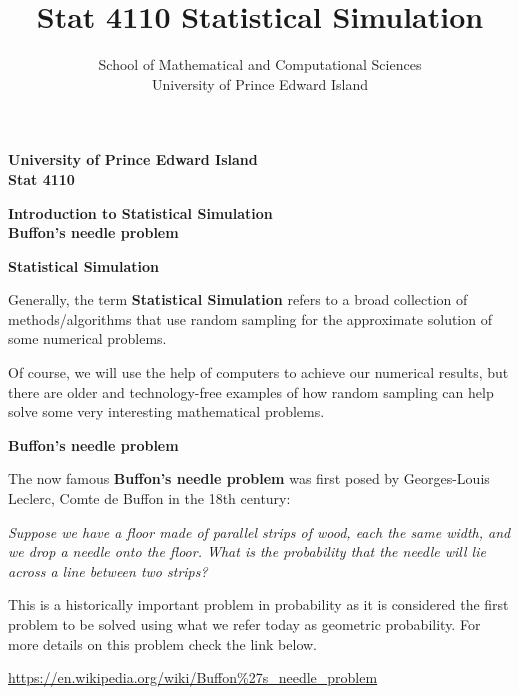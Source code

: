 \documentclass{beamer}
\title[Stat 4110]{Stat 4110 Statistical Simulation}
\author[University of Prince Edward Island]{School of Mathematical and Computational Sciences \\ University of Prince Edward Island}
\begin{document}
\frame
{
\begin{center}
\textbf{University of Prince Edward Island\\ Stat 4110}
\end{center}
\vspace{5mm}
\begin{center}
\textbf{Introduction to Statistical Simulation\\ Buffon's needle problem}\\
\end{center}
\vspace{5mm}

}

\frame
{

{\bf Statistical Simulation}
\vspace{2mm}

Generally, the term {\bf Statistical Simulation} refers to a broad collection of methods/algorithms that use \alert<1>{random sampling} for the approximate solution of some numerical problems.
\vspace{2mm}

Of course, we will use the help of computers to achieve our numerical results, but there are older and technology-free examples of  how random sampling can help solve some very interesting mathematical problems.

}

\frame
{

{\bf Buffon's needle problem}
\vspace{2mm}

The now famous {\bf Buffon's needle problem} was first posed by 
Georges-Louis Leclerc, Comte de Buffon in the 18th century:
\vspace{2mm}

{\it Suppose we have a floor made of parallel strips of wood, each the same width, and we drop a needle onto the floor. What is the probability that the needle will lie across a line between two strips? }

\vspace{2mm}

This is a historically important problem in probability as it is considered the first problem to be solved using what we refer today as geometric probability. For more details on this problem check the link below.
\vspace{2mm}

{\small \url{https://en.wikipedia.org/wiki/Buffon\%27s_needle_problem}}

}
\end{document}
